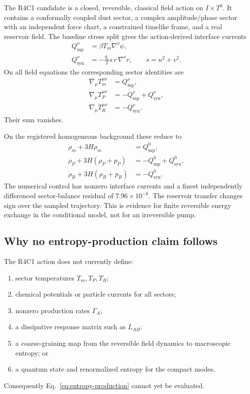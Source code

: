 \documentclass[aps,prd,reprint,superscriptaddress,nofootinbib,floatfix]{revtex4-2}
\newcommand{\Tthree}{T^{3}}
\newcommand{\Qmp}{Q_{\mathrm{mp}}}
\newcommand{\Qsyn}{Q_{\mathrm{syn}}}
\begin{document}
The R4C1 candidate is a closed, reversible, classical field action on
\(I\times\Tthree\).  It contains a conformally coupled dust sector, a complex
amplitude/phase sector with an independent force chart, a constrained timelike
frame, and a real reservoir field.  The baseline stress split gives the
action-derived interface currents
\begin{align}
 \Qmp^\nu&=\beta T_m\nabla^\nu\psi, \\
 \Qsyn^\nu&=-\frac{g_r}{2}s\,r\,\nabla^\nu r,
 \qquad s=u^2+v^2 .
 \label{eq:r4c1-currents}
\end{align}
On all field equations the corresponding sector identities are
\begin{align}
 \nabla_\mu T_m^{\mu\nu}&=\Qmp^\nu,\\
 \nabla_\mu T_P^{\mu\nu}&=-\Qmp^\nu+\Qsyn^\nu,\\
 \nabla_\mu T_R^{\mu\nu}&=-\Qsyn^\nu.
 \label{eq:r4c1-balances}
\end{align}
Their sum vanishes.

On the registered homogeneous background these reduce to
\begin{align}
 \dot\rho_m+3H\rho_m&=\Qmp^0,\\
 \dot\rho_P+3H(\rho_P+p_P)&=-\Qmp^0+\Qsyn^0,\\
 \dot\rho_R+3H(\rho_R+p_R)&=-\Qsyn^0.
 \label{eq:r4c1-frw}
\end{align}
The numerical control has nonzero interface currents and a finest independently
differenced sector-balance residual of \(7.96\times10^{-8}\).  The reservoir
transfer changes sign over the sampled trajectory.  This is evidence for
finite reversible energy exchange in the conditional model, not for an
irreversible pump.

\subsection{Why no entropy-production claim follows}

The R4C1 action does not currently define:
\begin{enumerate}
\item sector temperatures \(T_m,T_P,T_R\);
\item chemical potentials or particle currents for all sectors;
\item nonzero production rates \(\Gamma_A\);
\item a dissipative response matrix such as \(L_{AB}\);
\item a coarse-graining map from the reversible field dynamics to macroscopic
entropy; or
\item a quantum state and renormalized entropy for the compact modes.
\end{enumerate}
Consequently Eq.~\eqref{eq:entropy-production} cannot yet be evaluated.
\end{document}
